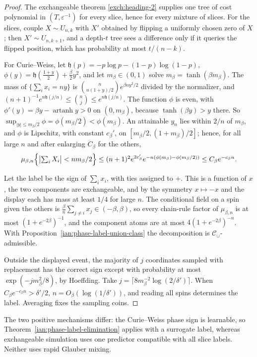 \begin{proof}
The exchangeable theorem \ref{exch:heading-2} supplies one tree of cost
polynomial in \((T,\varepsilon^{-1})\) for every slice, hence for every
mixture of slices. For the slices, couple \(X\sim U_{n,k}\) with \(X'\)
obtained by flipping a uniformly chosen zero of \(X\); then
\(X'\sim U_{n,k+1}\), and a depth-\(t\) tree sees a difference only if it
queries the flipped position, which has probability at most
\(t/(n-k)\).

For Curie--Weiss, let \(\mathfrak h(p)=-p\log p-(1-p)\log(1-p)\),
\(\phi(y)=\mathfrak h(\frac{1+y}2)+\frac\beta2y^2\), and let
\(m_\beta\in(0,1)\) solve \(m_\beta=\tanh(\beta m_\beta)\). The mass of
\(\{\sum_ix_i=ny\}\) is \(\binom n{n(1+y)/2}e^{\beta ny^2/2}\) divided by
the normalizer, and
\((n+1)^{-1}e^{n\mathfrak h(j/n)}\le\binom nj\le e^{n\mathfrak h(j/n)}\).
The function \(\phi\) is even, with
\(\phi'(y)=\beta y-\operatorname{artanh}y>0\) on \((0,m_\beta)\), because
\(\tanh(\beta y)>y\) there. So
\(\sup_{|y|\le m_\beta/2}\phi=\phi(m_\beta/2)<\phi(m_\beta)\). An
attainable \(y_n\) lies within \(2/n\) of \(m_\beta\), and \(\phi\) is
Lipschitz, with constant \(c_\beta'\), on
\([m_\beta/2,(1+m_\beta)/2]\); hence, for all large \(n\) and after
enlarging \(C_\beta\) for the others,
\[
 \mu_{\beta,n}\Bigl\{\bigl|\textstyle\sum_iX_i\bigr|<nm_\beta/2\Bigr\}
 \le(n+1)^2e^{2c_\beta'}e^{-n(\phi(m_\beta)-\phi(m_\beta/2))}
 \le C_\beta e^{-c_\beta n}.
\]

Let the label be the sign of \(\sum_ix_i\), with ties assigned to
\(+\). This is a function of \(x\), the two components are exchangeable,
and by the symmetry \(x\mapsto-x\) and the display each has mass at
least \(1/4\) for large \(n\). The conditional field on a spin given the
others is \(\frac\beta n\sum_{j\ne i}x_j\in(-\beta,\beta)\), so every
chain-rule factor of \(\mu_{\beta,n}\) is at most
\((1+e^{-2\beta})^{-1}\), and the component atoms are at most
\(4(1+e^{-2\beta})^{-n}\). With Proposition~\ref{ian:phase-label-union-class}
the decomposition is \(\mathcal C_\cup\)-admissible.

Outside the displayed event, the majority of \(j\) coordinates sampled
with replacement has the correct sign except with probability at most
\(\exp(-jm_\beta^2/8)\), by Hoeffding. Take
\(j=\lceil8m_\beta^{-2}\log(2/\delta')\rceil\). When
\(C_\beta e^{-c_\beta n}>\delta'/2\), \(n=O_\beta(\log(1/\delta'))\), and
reading all spins determines the label. Averaging fixes the sampling
coins.
\end{proof}

The two positive mechanisms differ: the Curie--Weiss phase sign is
learnable, so Theorem~\ref{ian:phase-label-elimination} applies with a
surrogate label, whereas exchangeable simulation uses one predictor
compatible with all slice labels. Neither uses rapid Glauber mixing.
